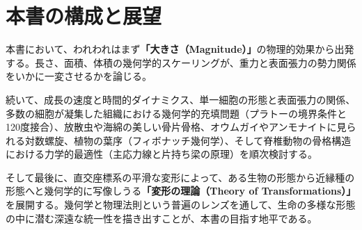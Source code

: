 \section{本書の構成と展望}

本書において、われわれはまず\textbf{「大きさ（Magnitude）」}の物理的効果から出発する。長さ、面積、体積の幾何学的スケーリングが、重力と表面張力の勢力関係をいかに一変させるかを論じる。

続いて、成長の速度と時間的ダイナミクス、単一細胞の形態と表面張力の関係、多数の細胞が凝集した組織における幾何学的充填問題（プラトーの境界条件と120度接合）、放散虫や海綿の美しい骨片骨格、オウムガイやアンモナイトに見られる対数螺旋、植物の葉序（フィボナッチ幾何学）、そして脊椎動物の骨格構造における力学的最適性（主応力線と片持ち梁の原理）を順次検討する。

そして最後に、直交座標系の平滑な変形によって、ある生物の形態から近縁種の形態へと幾何学的に写像しうる\textbf{「変形の理論（Theory of Transformations）」}を展開する。幾何学と物理法則という普遍のレンズを通して、生命の多様な形態の中に潜む深遠な統一性を描き出すことが、本書の目指す地平である。
